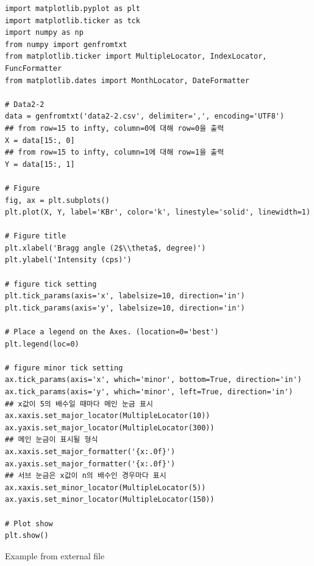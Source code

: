 \documentclass[a4paper, 10pt, nanum]{CSUniSchoolLabReport}
\begin{document}
\begin{listing}[ht!]
	\begin{verbatim}
import matplotlib.pyplot as plt
import matplotlib.ticker as tck
import numpy as np
from numpy import genfromtxt
from matplotlib.ticker import MultipleLocator, IndexLocator, FuncFormatter
from matplotlib.dates import MonthLocator, DateFormatter

# Data2-2
data = genfromtxt('data2-2.csv', delimiter=',', encoding='UTF8')
## from row=15 to infty, column=0에 대해 row=0을 출력
X = data[15:, 0]
## from row=15 to infty, column=1에 대해 row=1을 출력
Y = data[15:, 1]

# Figure
fig, ax = plt.subplots()
plt.plot(X, Y, label='KBr', color='k', linestyle='solid', linewidth=1)

# Figure title
plt.xlabel('Bragg angle (2$\\theta$, degree)')
plt.ylabel('Intensity (cps)')

# figure tick setting
plt.tick_params(axis='x', labelsize=10, direction='in')
plt.tick_params(axis='y', labelsize=10, direction='in')

# Place a legend on the Axes. (location=0='best')
plt.legend(loc=0)

# figure minor tick setting
ax.tick_params(axis='x', which='minor', bottom=True, direction='in')
ax.tick_params(axis='y', which='minor', left=True, direction='in')
## x값이 5의 배수일 때마다 메인 눈금 표시
ax.xaxis.set_major_locator(MultipleLocator(10)) 
ax.yaxis.set_major_locator(MultipleLocator(300))
## 메인 눈금이 표시될 형식
ax.xaxis.set_major_formatter('{x:.0f}')
ax.yaxis.set_major_formatter('{x:.0f}')
## 서브 눈금은 x값이 n의 배수인 경우마다 표시
ax.xaxis.set_minor_locator(MultipleLocator(5)) 
ax.yaxis.set_minor_locator(MultipleLocator(150))

# Plot show
plt.show()
	\end{verbatim}
	\caption{Example from external file}
	\label{listing:graph3-code}
\end{listing}



\end{document}
